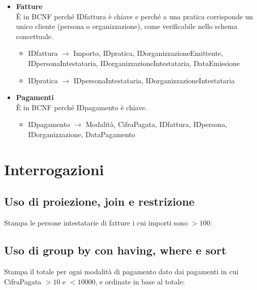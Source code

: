 \documentclass[a4paper,12pt]{article}
\begin{document}
\begin{itemize}
\item \textbf{Fatture}\\È in BCNF perché IDfattura è chiave e perché a una pratica corrisponde un unico cliente (persona o organizzazione), come verificabile nello schema concettuale.

\begin{itemize}
\item IDfattura $\rightarrow$ Importo, IDpratica, IDorganizzazioneEmittente, IDpersonaIntestataria, IDorganizzazioneIntestataria, DataEmissione

\item IDpratica $\rightarrow$ IDpersonaIntestataria, IDorganizzazioneIntestataria
\end{itemize}

\item \textbf{Pagamenti}\\È in BCNF perché IDpagamento è chiave.

\begin{itemize}
\item IDpagamento $\rightarrow$ Modalità, CifraPagata, IDfattura, IDpersona, IDorganizzazione, DataPagamento
\end{itemize}

\end{itemize}

 \section{ Interrogazioni }


 \subsection{ Uso di proiezione, join e restrizione }
Stampa le persone intestatarie di fatture i cui importi sono $> 100$:

\begin{minipage}{\textwidth}

\end{minipage}


 \subsection{ Uso di group by con having, where e sort }

Stampa il totale per ogni modalità di pagamento dato dai pagamenti in cui CifraPagata $> 10$ e $< 10000$, e ordinate in base al totale:

\begin{minipage}{\textwidth}

\end{minipage}
\end{document}
